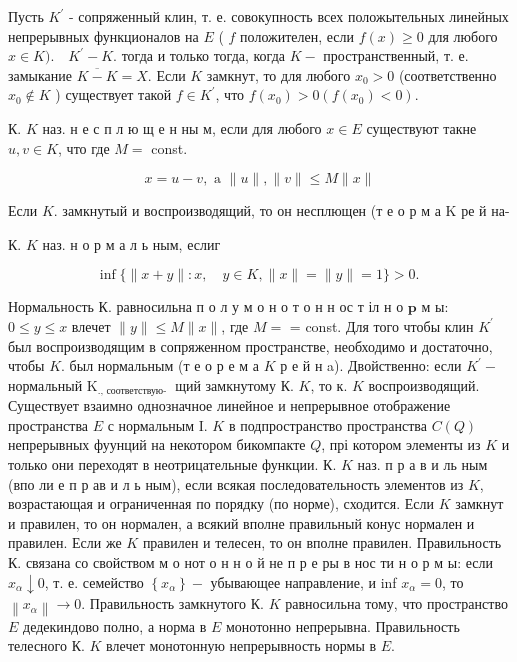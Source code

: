 \documentclass[10pt]{article}
\begin{document}
Пусть $K^{\prime}$ - сопряженный клин, т. е. совокупность всех положытельных линейных непрерывных функционалов на $E$ ( $f$ положителен, если $f(x) \geqslant 0$ для любого $x \in K) . \quad K^{\prime}-K$. тогда и только тогда, когда $K-$ пространственный, т. е. замыкание $\overline{K-K}=X$. Если $K$ замкнут, то для любого $x_{0}>0$ (соответственно $x_{0} \notin K$ ) существует такой $f \in K^{\prime}$, что $f\left(x_{0}\right)>0\left(f\left(x_{0}\right)<0\right)$.



К. $K$ наз. н е с п л ю щ е н ны м, если для любого $x \in E$ существуют такне $u, v \in K$, что где $M=$ const.



\[

x=u-v, \text { a }\|u\|,\|v\| \leqslant M\|x\|

\]



Если $K$. замкнутый и воспроизводящий, то он несплющен (т е о р м а $\mathrm{K}$ ре й на-



К. $K$ наз. н о р м а л ь ным, еслиг



\[

\inf \{\|x+y\|: x, \quad y \in K,\|x\|=\|y\|=1\}>0 \text {. }

\]



Нормальность $К$. равносильна п о л у м о н о т о н н ос т іл н о $\mathbf{p}$ м ы: $0 \leqslant y \leqslant x$ влечет $\|y\| \leqslant M\|x\|$, где $M=$ = const. Для того чтобы клин $K^{\prime}$ был воспроизводящим в сопряженном пространстве, необходимо и достаточно, чтобы $K$. был нормальным (т е о р е м а $K$ р е й н a). Двойственно: если $K^{\prime}-$ нормальный $\mathrm{K}_{\text {., соответствую- }}$ щий замкнутому К. $K$, то к. $K$ воспроизводящий. Существует взаимно однозначное линейное и непрерывное отображение пространства $E$ с нормальным I. $K$ в подпространство пространства $C(Q)$ непрерывных фуунций на некотором бикомпакте $Q$, прі котором элементы из $K$ и только они переходят в неотрицательные функции. К. $K$ наз. п р а в и ль ным (впо ли е п р ав и л ь ным), если всякая последовательность элементов из $K$, возрастающая и ограниченная по порядку (по норме), сходится. Если $K$ замкнут и правилен, то он нормален, а всякий вполне правильный конус нормален и правилен. Если же $K$ правилен и телесен, то он вполне правилен. Правильность К. связана со свойством м о нот о н н о й не п р е ры в нос ти н о р м ы: если $x_{\alpha} \downarrow 0$, т. е. семейство $\left\{x_{\alpha}\right\}-$ убывающее направление, и inf $x_{\alpha}=0$, то $\left\|x_{\alpha}\right\| \rightarrow 0$. Правильность замкнутого К. $K$ равносильна тому, что пространство $E$ дедекиндово полно, а норма в $E$ монотонно непрерывна. Правильность телесного К. $K$ влечет монотонную непрерывность нормы в $E$.
\end{document}
